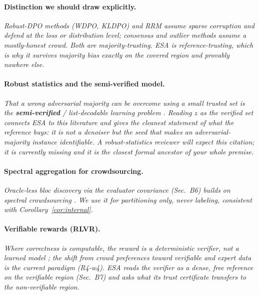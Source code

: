 \documentclass[11pt]{article}
\theoremstyle{definition}
\theoremstyle{remark}
\begin{document}
\paragraph{Distinction we should draw explicitly.}
\noindent\emph{Robust-DPO methods (WDPO, KLDPO) and RRM assume sparse corruption and defend at the
loss or distribution level; consensus and outlier methods assume a mostly-honest crowd. Both are
majority-trusting. ESA is reference-trusting, which is why it survives majority bias exactly on the
covered region and provably nowhere else.}

\paragraph{Robust statistics and the semi-verified model.}
\noindent\emph{That a wrong \emph{adversarial} majority can be overcome using a small trusted set is
the \textbf{semi-verified} / list-decodable learning problem \citep{charikar2017untrusted,steinhardt2018resilience}. Reading $z$ as the verified set connects ESA to this literature and gives the
cleanest statement of what the reference buys: it is not a denoiser but the seed that makes an
adversarial-majority instance identifiable. A robust-statistics reviewer will expect this citation;
it is currently missing and it is the closest formal ancestor of your whole premise.}

\paragraph{Spectral aggregation for crowdsourcing.}
\noindent\emph{Oracle-less bloc discovery via the evaluator covariance (Sec.~B6) builds on spectral
crowdsourcing \citep{karger2011iterative,zhang2014spectral,ghosh2011moderators,dalvi2013aggregating}. We use it for partitioning only, never labeling, consistent with Corollary~\ref{cor:internal}.}

\paragraph{Verifiable rewards (RLVR).}
\noindent\emph{Where correctness is computable, the reward is a deterministic verifier, not a
learned model \citep{lambert2024tulu,guo2025deepseekr1,shao2024deepseekmath}; the shift from crowd
preferences toward verifiable and expert data is the current paradigm (R4-w4). ESA reads the
verifier as a dense, free reference on the verifiable region (Sec.~B7) and asks what its trust
certificate transfers to the non-verifiable region.}
\end{document}
